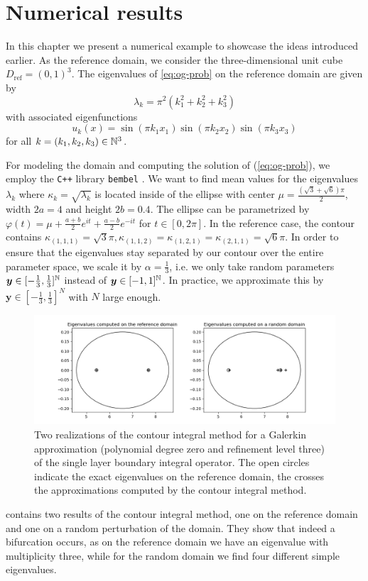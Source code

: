 \chapter{Numerical results}\label{chapter:numerical-results}
In this chapter we present a numerical example to showcase the ideas introduced earlier.
As the reference domain, we consider the three-dimensional unit cube $D_{\text{ref}} = (0,1)^3$.
The eigenvalues of \eqref{eq:og-prob} on the reference domain are given by 
\[
    \lambda_k = \pi^2(k_1^2+k_2^2+k_3^2)
\]
with associated eigenfunctions
\[
    u_k(x) = \sin(\pi k_1 x_1)\sin(\pi k_2 x_2)\sin(\pi k_3 x_3)
\]
for all $k = (k_1,k_2,k_3)\in \mathbb{N}^3$.

For modeling the domain and computing the solution of (\ref{eq:og-prob}), we employ the \texttt{C++} library \texttt{bembel} \cite{Bembel2020}.
We want to find mean values for the eigenvalues $\lambda_k$ where $\kappa_k = \sqrt{\lambda_{k}}$ is located inside of the ellipse with center $\mu = \frac{(\sqrt{3}+\sqrt{6})\pi}{2}$, width $2a = 4$ and height $2b = 0.4$.
The ellipse can be parametrized by $\varphi(t) = \mu + \frac{a+b}{2}e^{it} + \frac{a-b}{2}e^{-it}$ for $t\in [0,2\pi]$.
In the reference case, the contour contains $\kappa_{(1,1,1)} = \sqrt{3}\pi, \kappa_{(1,1,2)} = \kappa_{(1,2,1)} = \kappa_{(2,1,1)} = \sqrt{6}\pi$.
In order to ensure that the eigenvalues stay separated by our contour over the entire parameter space, we scale it by $\alpha = \frac{1}{3}$, i.e. we only take random parameters $\boldsymbol{y} \in [-\frac{1}{3},\frac{1}{3}]^{\mathbb{N}}$ instead of  $\boldsymbol{y} \in [-1,1]^{\mathbb{N}}$. In practice, we approximate this by $\boldsymbol{y} \in [-\frac{1}{3},\frac{1}{3}]^N$ with $N$ large enough.
\begin{figure}
    \centering
    \includegraphics[width=\textwidth]{chapter_numerical_results/both_new_ratio_new_size.png}
    \caption{Two realizations of the contour integral method for a Galerkin approximation (polynomial degree zero and refinement level three) of the single layer boundary integral operator. The open circles indicate the exact eigenvalues on the reference domain, the crosses the approximations computed by the contour integral method.}
    \label{fig:cim}
\end{figure}
 contains two results of the contour integral method, one on the reference domain and one on a random perturbation of the domain. They show that indeed a bifurcation occurs, as on the reference domain we have an eigenvalue with multiplicity three, while for the random domain we find four different simple eigenvalues.

